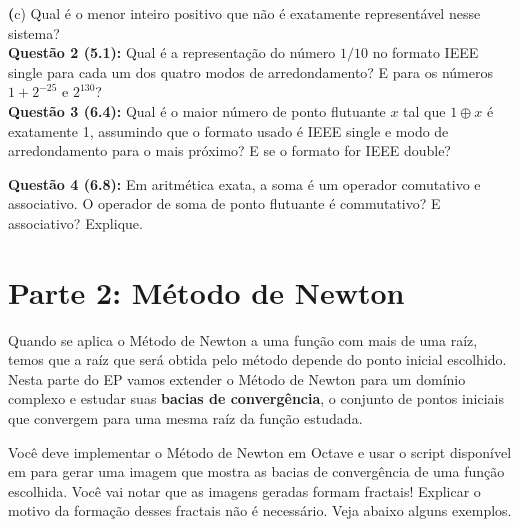 \documentclass[12pt]{article}
\newcommand{\questao}[1] {\vspace{12pt} \noindent \large \textbf{Questão #1:} \normalsize}
\renewcommand{\part}[1] {\noindent\textbf (#1)}
\begin{document}
\part{c} Qual é o menor inteiro positivo que não é exatamente 
representável nesse sistema? \\

\questao{2 (5.1)}
Qual é a representação do número $1/10$ no formato IEEE single para
cada um dos quatro modos de arredondamento? E para os números 
$1 + 2^{-25}$ e $2^{130}$?\\

\questao{3 (6.4)}
Qual é o maior número de ponto flutuante $x$ tal que $1 \oplus x$ é
exatamente 1, assumindo que o formato usado é IEEE single e modo de 
arredondamento para o mais próximo? E se o formato for IEEE double?

\questao{4 (6.8)} Em aritmética exata, a soma é um operador
comutativo e associativo. O operador de soma de ponto flutuante é 
commutativo? E associativo? Explique.

\section{Parte 2: Método de Newton}
Quando se aplica o Método de Newton a uma função com mais de uma raíz,
temos que a raíz que será obtida pelo método depende do ponto inicial 
escolhido. Nesta parte do EP vamos extender o Método de Newton para um
domínio complexo e estudar suas \textbf{bacias de convergência}, o 
conjunto de pontos iniciais que convergem para uma mesma raíz da função
estudada.

Você deve implementar o Método de Newton em Octave e usar o script 
disponível em \href{algumlugar}{} para gerar uma imagem que mostra as
bacias de convergência de uma função escolhida. Você vai notar que as
imagens geradas formam fractais! Explicar o motivo da formação desses
fractais não é necessário. Veja abaixo alguns exemplos.
\end{document}

